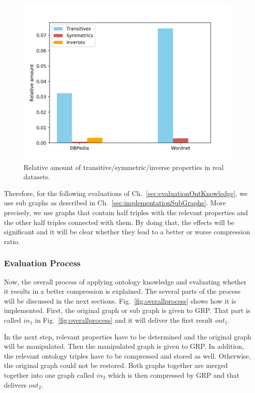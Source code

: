 \begin{figure}
	\centering
	\includegraphics[width=0.7\linewidth]{figures/4_evaluation/ontOccurrences}
	\caption{Relative amount of transitive/symmetric/inverse properties in real datasets.}
	\label{fig:ontoccurrences}
\end{figure}


Therefore, for the following evaluations of Ch.~\ref{sec:evaluationOntKnowledge}, we use sub graphs as described in Ch.~\ref{sec:implementationSubGraphs}. More precisely, we use graphs that contain half triples with the relevant properties and the other half triples connected with them. By doing that, the effects will be significant and it will be clear whether they lead to a better or worse compression ratio. 

\subsubsection{Evaluation Process}
Now, the overall process of applying ontology knowledge and evaluating whether it results in a better compression is explained. The several parts of the process will be discussed in the next sections. Fig.~\ref{fig:overallprocess} shows how it is implemented. First, the original graph or sub graph is given to GRP. That part is called $in_1$ in Fig.~\ref{fig:overallprocess} and it will deliver the first result $out_1$.

In the next step, relevant properties have to be determined and the original graph will be manipulated. Then the manipulated graph is given to GRP. In addition, the relevant ontology triples have to be compressed and stored as well. Otherwise, the original graph could not be restored. Both graphs together are merged together into one graph called $in_2$ which is then compressed by GRP and that delivers $out_2$. 

